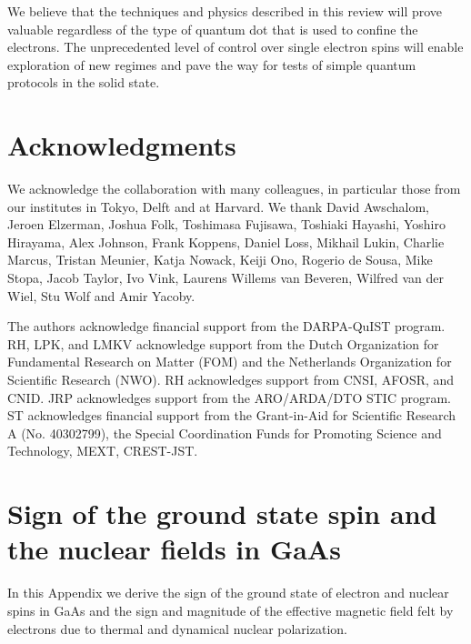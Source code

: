 \documentclass[rmp,twocolumn,aps]{revtex4}
\begin{document}
We believe that the techniques and physics described in this review will 
prove valuable regardless of the type of quantum dot that is used to confine the 
electrons. The unprecedented level of control over single electron spins will 
enable exploration of new regimes and pave the way for tests of simple quantum 
protocols in the solid state.

\section*{Acknowledgments}
We acknowledge the collaboration with many colleagues, in particular those from our institutes in Tokyo, Delft and at Harvard. We thank David Awschalom, Jeroen Elzerman, Joshua Folk, Toshimasa Fujisawa, Toshiaki Hayashi, Yoshiro Hirayama, Alex Johnson, Frank Koppens, Daniel Loss, Mikhail Lukin, Charlie Marcus, Tristan Meunier, Katja Nowack, Keiji Ono, Rogerio de Sousa, Mike Stopa, Jacob Taylor, Ivo Vink, Laurens Willems van Beveren, Wilfred van der Wiel, Stu Wolf and Amir Yacoby.

The authors acknowledge financial support from the DARPA-QuIST program.
RH, LPK, and LMKV acknowledge support from the Dutch Organization for Fundamental Research on Matter (FOM) and the Netherlands Organization for Scientific Research (NWO). RH acknowledges support from CNSI, AFOSR, and CNID. JRP acknowledges support from the ARO/ARDA/DTO STIC program.
ST acknowledges financial support from the Grant-in-Aid for Scientific Research A (No. 40302799), the Special Coordination Funds for Promoting 
Science and Technology, MEXT, CREST-JST.

\appendix
\section{Sign of the ground state spin and the nuclear fields in GaAs}
\label{App:nuclearfield} In this Appendix we derive the sign of
the ground state of electron and nuclear spins in GaAs and the
sign and magnitude of the effective magnetic field felt by
electrons due to thermal and dynamical nuclear polarization.
\end{document}

